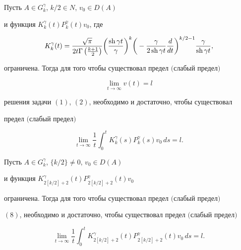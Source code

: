 \begin{thm}


Пусть $A\in G_k^\gamma$, $k/2 \in N$, $v_0\in D(A)$


и функция $K_k^\gamma(t)P_k^\gamma(t)v_0$, где


$$


K_k^\gamma(t)=\frac{\sqrt{\pi}}{2t


\Gamma\left(\frac{k+1}{2}\right)}


\bigg(\frac{\sh \gamma t}{\gamma}\bigg)^{k}


\bigg(-\frac{\gamma}{2 \sh \gamma t} \frac{d}{dt}\bigg)^{k/2-1}


\frac{\gamma}{\sh \gamma t},


$$


ограничена. Тогда для того чтобы существовал предел $($слабый предел$)$


\begin{equation}


\lim_{t\to\infty}v(t)=l


\end{equation}


решения задачи $(1)$, $(2)$, необходимо и достаточно, чтобы существовал


предел $($слабый предел$)$


\begin{equation}


\lim_{t\to\infty}\frac{1}{t}


\int_0^t K_k^\gamma(s) P_k^\gamma(s)v_0\, ds=l.


\end{equation}


\end{thm}





\begin{thm}


Пусть $A\in G_k^\gamma$, $\{k/2\}\neq0$, $v_0\in D(A)$


и функция $K_{2[k/2]+2}^\gamma(t)P_{2[k/2]+2}^\gamma(t)v_0$


ограничена. Тогда для того чтобы существовал предел $($слабый предел$)$


$(8)$, необходимо и достаточно, чтобы существовал предел $($слабый предел$)$


\begin{equation}


\lim_{t\to\infty}\frac{1}{t}


\int_0^t K_{2[k/2]+2}^\gamma(t)P_{2[k/2]+2}^\gamma(t)v_0\, ds=l.


\end{equation}


\end{thm}





